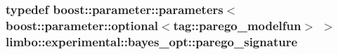 \subsubsection[{parego\+\_\+signature}]{\setlength{\rightskip}{0pt plus 5cm}typedef boost\+::parameter\+::parameters$<$boost\+::parameter\+::optional$<$tag\+::parego\+\_\+modelfun$>$ $>$ {\bf limbo\+::experimental\+::bayes\+\_\+opt\+::parego\+\_\+signature}}\label{namespacelimbo_1_1experimental_1_1bayes__opt_aa1bdc78504860120d6bc0f395f986f57}
